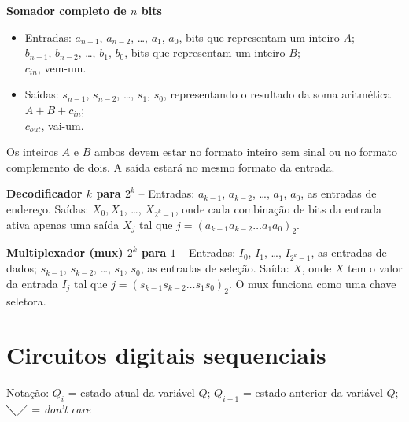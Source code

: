 \documentclass[a4paper,11pt]{article}
\begin{document}
\newpage

\textbf{Somador completo de $n$ bits}
\begin{itemize}
\setlength{\itemsep}{-2pt}
    \item Entradas: $a_{n-1}$, $a_{n-2}$, \ldots, $a_1$, $a_0$, bits que representam um inteiro $A$;\\
    \phantom{Entradas: }$b_{n-1}$, $b_{n-2}$, \ldots, $b_1$, $b_0$, bits que representam um inteiro $B$;\\
    \phantom{Entradas: }$c_{in}$, vem-um.
    \item Saídas: $s_{n-1}$, $s_{n-2}$, \ldots, $s_1$, $s_0$, representando o resultado da soma aritmética $A+B+c_{in}$;\\
    \phantom{Saídas: }$c_{out}$, vai-um.
\end{itemize}
Os inteiros $A$ e $B$ ambos devem estar no formato inteiro sem sinal ou no formato complemento de dois. A saída estará no mesmo formato da entrada.

\textbf{Decodificador $k$ para $2^k$} -- Entradas: $a_{k-1}$, $a_{k-2}$, \ldots, $a_1$, $a_0$, as entradas de endereço. Saídas: $X_0, X_1$, \ldots, $X_{2^k-1}$, onde cada combinação de bits da entrada ativa apenas uma saída $X_{j}$ tal que $j = (a_{k-1} a_{k-2} \ldots a_1 a_0)_2$.

\textbf{Multiplexador (mux) $2^k$ para $1$} -- Entradas: $I_0$, $I_1$, \ldots, $I_{2^k-1}$, as entradas de dados; $s_{k-1}$, $s_{k-2}$, \ldots, $s_1$, $s_0$, as entradas de seleção. Saída: $X$, onde $X$ tem o valor da entrada $I_j$ tal que $j = (s_{k-1} s_{k-2} \ldots s_1 s_0)_2$. O mux funciona como uma chave seletora.

\section{Circuitos digitais sequenciais}

\newlength{\lengthOfDiagdown}
\settowidth{\lengthOfDiagdown}{$\diagdown$}
\def\X{$\diagdown$\hspace{-\lengthOfDiagdown}$\diagup$}

\def\CK{%
\begin{picture}(10,10)%
\thicklines%
\put(0,10){\line(1,0){5}}%
\put(5,10){\line(0,-1){10}}%
\put(5,0){\line(1,0){5}}%
\put(5,10){\vector(0,-1){9}}%
\end{picture}%
}

Notação: $Q_i$ = estado atual da variável $Q$; \hspace{3ex} $Q_{i-1}$ = estado anterior da variável $Q$; \hspace{3ex} \X{} = \emph{don't care}
\end{document}
